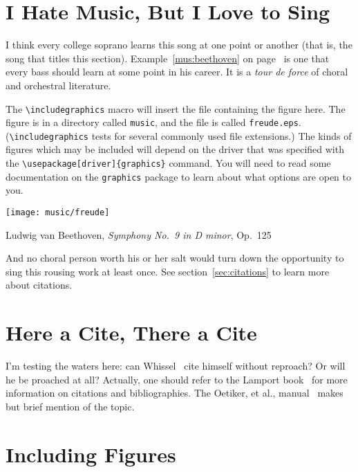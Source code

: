 \section{I Hate Music, But I Love to Sing}

I think every college soprano learns this song at one point or another
(that is, the song that titles this section).
Example~\ref{mus:beethoven} on page~\pageref{mus:beethoven} is one
that every bass should learn at some point in his career.  It is a
\textit{tour de force} of choral and orchestral literature.

The \verb+\includegraphics+ macro will insert the file containing the
figure here.  The figure is in a directory called \texttt{music}, and
the file is called \texttt{freude.eps}.  (\verb+\includegraphics+
tests for several commonly used file extensions.)  The kinds of
figures which may be included will depend on the driver that was
specified with the \verb+\usepackage[driver]{graphics}+ command.  You
will need to read some documentation on the \texttt{graphics} package
to learn about what options are open to you.

\begin{musex}
\begin{center}
\texttt{[image: music/freude]}
\end{center}
\caption{Ludwig van Beethoven, \textit{Symphony No.~9 in D minor},
  Op.~125\label{mus:beethoven}}
\end{musex}

And no choral person worth his or her salt would turn down the
opportunity to sing this rousing work at least once.
See section~\ref{sec:citations} to learn more about citations.

\section{Here a Cite, There a Cite\label{sec:citations}}

I'm testing the waters here:  can Whissel~\cite{whis86} cite himself
without reproach?  Or will he be proached at all?  Actually, one should
refer to the Lamport book~\cite{LatexBook} for more information on
citations and bibliographies.  The Oetiker, et al., manual~\cite{NotShort}
makes but brief mention of the topic.

\section{Including Figures}

